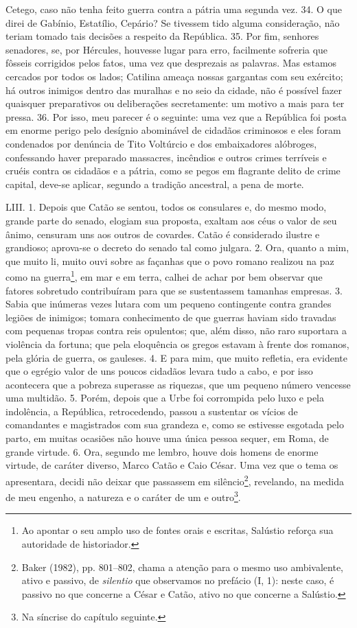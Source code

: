 Cetego, caso não tenha feito guerra contra a pátria uma segunda vez. 34. O que
direi de Gabínio, Estatílio, Cepário? Se tivessem tido alguma consideração, não
teriam tomado tais decisões a respeito da República. 35. Por fim, senhores
senadores, se, por Hércules, houvesse lugar para erro, facilmente sofreria que
fôsseis corrigidos pelos fatos, uma vez que desprezais as palavras. Mas estamos
cercados por todos os lados; Catilina ameaça nossas gargantas com seu exército;
há outros inimigos dentro das muralhas e no seio da cidade, não é possível
fazer quaisquer preparativos ou deliberações secretamente: um motivo a mais
para ter pressa. 36. Por isso, meu parecer é o seguinte: uma vez que a
República foi posta em enorme perigo pelo desígnio abominável de cidadãos
criminosos e eles foram condenados por denúncia de Tito Voltúrcio e dos
embaixadores alóbroges, confessando haver preparado massacres, incêndios e
outros crimes terríveis e cruéis contra os cidadãos e a pátria, como se pegos
em flagrante delito de crime capital, deve-se aplicar, segundo a tradição
ancestral, a pena de morte.

LIII. 1. Depois que Catão se sentou, todos os consulares e, do mesmo modo,
grande parte do senado, elogiam sua proposta, exaltam aos céus o valor de seu
ânimo, censuram uns aos outros de covardes. Catão é considerado ilustre e
grandioso; aprova-se o decreto do senado tal como julgara. 2. Ora, quanto a
mim, que muito li, muito ouvi sobre as façanhas que o povo romano realizou na
paz como na guerra\footnote{Ao apontar o seu amplo uso de fontes orais e
escritas, Salústio reforça sua autoridade de historiador.}, em mar e em terra,
calhei de achar por bem observar que fatores sobretudo contribuíram para que se
sustentassem tamanhas empresas. 3. Sabia que inúmeras vezes lutara com um
pequeno contingente contra grandes legiões de inimigos; tomara conhecimento de
que guerras haviam sido travadas com pequenas tropas contra reis opulentos;
que, além disso, não raro suportara a violência da fortuna; que pela eloquência
os gregos estavam à frente dos romanos, pela glória de guerra, os gauleses. 4.
E para mim, que muito refletia, era evidente que o egrégio valor de uns poucos
cidadãos levara tudo a cabo, e por isso acontecera que a pobreza superasse as
riquezas, que um pequeno número vencesse uma multidão. 5. Porém, depois que a
Urbe foi corrompida pelo luxo e pela indolência, a República, retrocedendo,
passou a sustentar os vícios de comandantes e magistrados com sua grandeza e,
como se estivesse esgotada pelo parto, em muitas ocasiões não houve uma única
pessoa sequer, em Roma, de grande virtude. 6. Ora, segundo me lembro, houve
dois homens de enorme virtude, de caráter diverso, Marco Catão e Caio César.
Uma vez que o tema os apresentara, decidi não deixar que passassem em
silêncio\footnote{Baker (1982), pp. 801--802, chama a atenção para o mesmo uso
ambivalente, ativo e passivo, de \emph{silentio} que observamos no prefácio (I,
1): neste caso, é passivo no que concerne a César e Catão, ativo no que
concerne a Salústio.}, revelando, na medida de meu engenho, a natureza e o
caráter de um e outro\footnote{Na síncrise do capítulo seguinte.}. 

